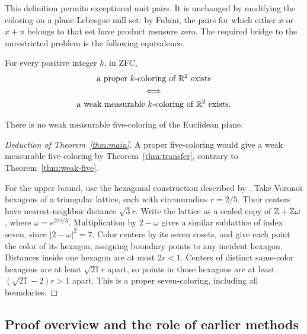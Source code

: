 This definition permits exceptional unit pairs. It is unchanged by
modifying the coloring on a plane Lebesgue null set: by Fubini, the
pairs for which either $x$ or $x+u$ belongs to that set have product
measure zero. The required bridge to the unrestricted problem is the
following equivalence.

\begin{theorem}\label{thm:transfer}
For every positive integer $k$, in ZFC,
\begin{equation}\label{eq:source-1}
  \begin{gathered}
    \text{a proper $k$-coloring of $\mathbb R^2$ exists}
    \\ \Longleftrightarrow \\
    \text{a weak measurable $k$-coloring of $\mathbb R^2$ exists}.
  \end{gathered}
\end{equation}
\end{theorem}

\begin{theorem}\label{thm:weak-five}
There is no weak measurable five-coloring of the Euclidean plane.
\end{theorem}

\begin{proof}[Deduction of Theorem~\ref{thm:main}]
A proper five-coloring would give a weak measurable five-coloring by
Theorem~\ref{thm:transfer}, contrary to Theorem~\ref{thm:weak-five}.

For the upper bound, use the hexagonal construction described by
\citet{Hadwiger1961}.
Take Voronoi hexagons of a triangular lattice, each with circumradius
$r=2/5$. Their centers have nearest-neighbor distance $\sqrt3r$.
Write the lattice as a scaled copy of $\mathbb Z+\mathbb Z\omega$, where
$\omega=e^{2\pi i/3}$. Multiplication by $2-\omega$ gives a similar
sublattice of index seven, since $|2-\omega|^2=7$. Color centers by
its seven cosets, and give each point the color of its hexagon,
assigning boundary points to any incident hexagon. Distances inside
one hexagon are at most $2r<1$. Centers of distinct same-color
hexagons are at least $\sqrt{21}r$ apart, so points in those hexagons
are at least $(\sqrt{21}-2)r>1$ apart. This is a proper seven-coloring,
including all boundaries.
\end{proof}

\subsection{Proof overview and the role of earlier methods}

